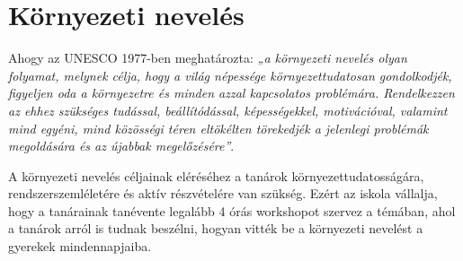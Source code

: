 \hypertarget{kornyezeti-neveles}{%
\section{Környezeti nevelés}\label{kornyezeti-neveles}}

Ahogy az UNESCO 1977-ben meghatározta: \emph{„a környezeti nevelés olyan
folyamat, melynek célja, hogy a világ népessége környezettudatosan
gondolkodjék, figyeljen oda a környezetre és minden azzal kapcsolatos
problémára. Rendelkezzen az ehhez szükséges tudással, beállítódással,
képességekkel, motivációval, valamint mind egyéni, mind közösségi téren
eltökélten törekedjék a jelenlegi problémák megoldására és az újabbak
megelőzésére''}.

A környezeti nevelés céljainak eléréséhez a tanárok
környezettudatosságára, rendszerszemléletére és aktív részvételére van
szükség. Ezért az iskola vállalja, hogy a tanárainak tanévente legalább
4 órás workshopot szervez a témában, ahol a tanárok arról is tudnak
beszélni, hogyan vitték be a környezeti nevelést a gyerekek
mindennapjaiba.
